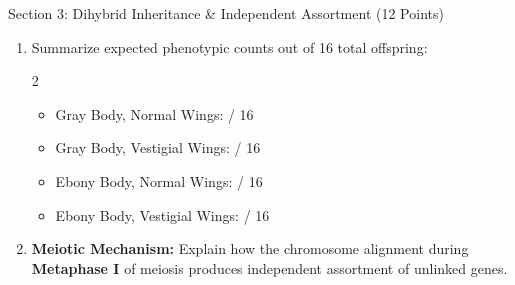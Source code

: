 \documentclass[10pt,a4paper]{scrartcl}
\begin{document}
\begin{sectionbox}{Section 3: Dihybrid Inheritance \& Independent Assortment (12 Points)}
\begin{enumerate}
  \vspace{1pt}
  \begin{enumerate}[resume]
    \item Summarize expected phenotypic counts out of 16 total offspring:
    \begin{multicols}{2}
      \begin{itemize}[label={\small\faCheck}]
        \item Gray Body, Normal Wings: \underline{\hspace{1.2cm}} / 16
        \item Gray Body, Vestigial Wings: \underline{\hspace{1.2cm}} / 16
        \item Ebony Body, Normal Wings: \underline{\hspace{1.2cm}} / 16
        \item Ebony Body, Vestigial Wings: \underline{\hspace{1.2cm}} / 16
      \end{itemize}
    \end{multicols}

    \item \textbf{Meiotic Mechanism:} Explain how the chromosome alignment during \textbf{Metaphase I} of meiosis produces independent assortment of unlinked genes.
  \end{enumerate}

  \vspace{1pt}
  \begin{workspace}
    \vspace{0.8cm}
  \end{workspace}
\end{enumerate}
\end{sectionbox}

\vspace{3pt}
\end{document}
